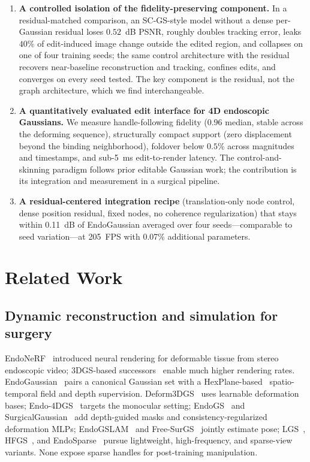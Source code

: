 \documentclass[AMA,Times1COL]{WileyNJDv5} %
\begin{document}
\begin{enumerate}[1.]
\item \textbf{A controlled isolation of the fidelity-preserving component.} In a residual-matched comparison, an SC-GS-style model without a dense per-Gaussian residual loses $0.52$~dB PSNR, roughly doubles tracking error, leaks $40\%$ of edit-induced image change outside the edited region, and collapses on one of four training seeds; the same control architecture with the residual recovers near-baseline reconstruction and tracking, confines edits, and converges on every seed tested. The key component is the residual, not the graph architecture, which we find interchangeable.

\item \textbf{A quantitatively evaluated edit interface for 4D endoscopic Gaussians.} We measure handle-following fidelity ($0.96$ median, stable across the deforming sequence), structurally compact support (zero displacement beyond the binding neighborhood), foldover below $0.5\%$ across magnitudes and timestamps, and sub-5~ms edit-to-render latency. The control-and-skinning paradigm follows prior editable Gaussian work; the contribution is its integration and measurement in a surgical pipeline.

\item \textbf{A residual-centered integration recipe} (translation-only node control, dense position residual, fixed nodes, no coherence regularization) that stays within 0.11~dB of EndoGaussian averaged over four seeds---comparable to seed variation---at 205~FPS with 0.07\% additional parameters.
\end{enumerate}

\section{Related Work}\label{sec2}

\subsection{Dynamic reconstruction and simulation for surgery}

EndoNeRF~\cite{wang2022endonerf} introduced neural rendering for deformable tissue from stereo endoscopic video; 3DGS-based successors~\cite{kerbl2023gaussian} enable much higher rendering rates. EndoGaussian~\cite{liu2024endogaussian} pairs a canonical Gaussian set with a HexPlane-based~\cite{cao2023hexplane} spatio-temporal field and depth supervision. Deform3DGS~\cite{yang2024deform3dgs} uses learnable deformation bases; Endo-4DGS~\cite{huang2024endo4dgs} targets the monocular setting; EndoGS~\cite{zhu2024endogs} and SurgicalGaussian~\cite{xie2024surgicalgaussian} add depth-guided masks and consistency-regularized deformation MLPs; EndoGSLAM~\cite{wang2024endogslam} and Free-SurGS~\cite{guo2024freesurgs} jointly estimate pose; LGS~\cite{liu2024lgs}, HFGS~\cite{zhao2024hfgs}, and EndoSparse~\cite{li2024endosparse} pursue lightweight, high-frequency, and sparse-view variants. None expose sparse handles for post-training manipulation.
\end{document}
